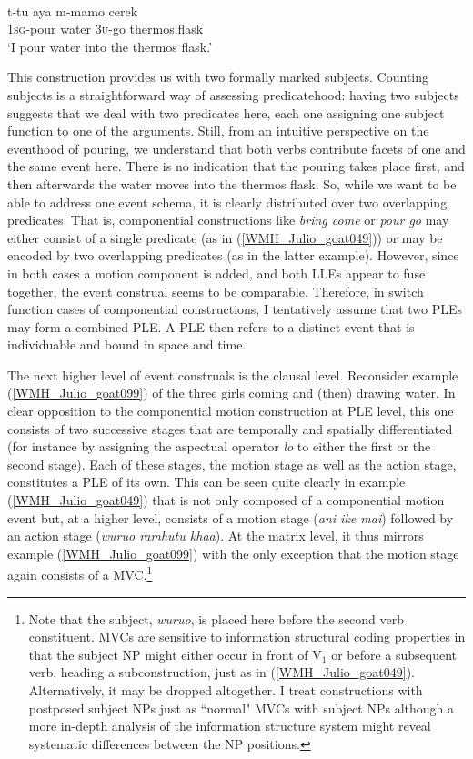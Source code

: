 \ea 
{}\\
\gll t-tu aya m-mamo cerek \\
1\textsc{sg}-pour water 3\textsc{u}-go thermos.flask \\
\glft `I pour water into the thermos flask.'\\
\z

This construction provides us with two formally marked subjects. Counting subjects is a straightforward way of assessing predicatehood: having two subjects suggests that we deal with two predicates here, each one assigning one subject function to one of the arguments. Still, from an intuitive perspective on the eventhood of pouring, we understand that both verbs contribute facets of one and the same event here. There is no indication that the pouring takes place first, and then afterwards the water moves into the thermos flask. So, while we want to be able to address one event schema, it is clearly distributed over two overlapping predicates. That is, componential constructions like \textit{bring come} or \textit{pour go} may either consist of a single predicate (as in (\ref{WMH_Julio_goat049})) or may be encoded by two overlapping predicates (as in the latter example). However, since in both cases a motion component is added, and both LLEs appear to fuse together, the event construal seems to be comparable. Therefore, in switch function cases of componential constructions, I tentatively assume that two PLEs may form a combined PLE. A PLE then refers to a distinct event that is individuable and bound in space and time.

\largerpage[-2]
The next higher level of event construals is the clausal level. Reconsider example (\ref{WMH_Julio_goat099}) of the three girls coming and (then) drawing water. In clear opposition to the componential motion construction at PLE level, this one consists of two successive stages that are temporally and spatially differentiated (for instance by assigning the aspectual operator \textit{lo} to either the first or the second stage). Each of these stages, the motion stage as well as the action stage, constitutes a PLE of its own. This can be seen quite clearly in example (\ref{WMH_Julio_goat049}) that is not only composed of a componential motion event but, at a higher level, consists of a motion stage (\textit{ani ike mai}) followed by an action stage (\textit{wuruo ramhutu khaa}). At the matrix level, it thus mirrors example (\ref{WMH_Julio_goat099}) with the only exception that the motion stage again consists of a MVC.\footnote{Note that the subject, \textit{wuruo}, is placed here before the second verb constituent.  MVCs are sensitive to information structural coding properties in that the subject NP might either occur in front of V$_1$ or before a subsequent verb, heading a subconstruction, just as in (\ref{WMH_Julio_goat049}). Alternatively, it may be dropped altogether. I treat constructions with postposed subject NPs just as ``normal" MVCs with subject NPs although a more in-depth analysis of the  information structure system might reveal systematic differences between the NP positions.}

